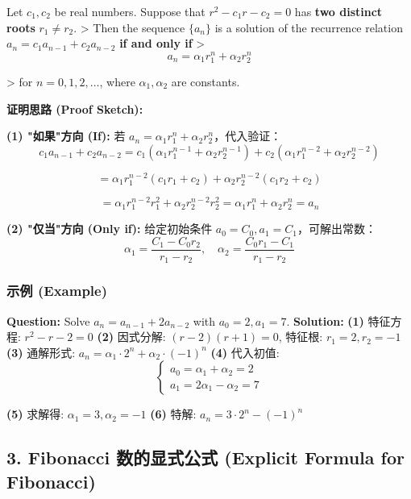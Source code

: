 \documentclass[10pt,a4paper,openany]{ctexbook}
\theoremstyle{definition}
\theoremstyle{remark}
\renewenvironment{quote}
  {\list{}{\leftmargin=1em\rightmargin=0pt\topsep=0.5pt\partopsep=0pt}\item[]}
  {\endlist}
\begin{document}
\begin{quote}
Let $c_1, c_2$ be real numbers. Suppose that $r^2 - c_1 r - c_2 = 0$ has \textbf{two distinct roots} $r_1 \neq r_2$.
>
Then the sequence $\{a_n\}$ is a solution of the recurrence relation $a_n = c_1 a_{n-1} + c_2 a_{n-2}$ \textbf{if and only if}
>
\[
a_n = \alpha_1 r_1^n + \alpha_2 r_2^n
\]

>
for $n = 0, 1, 2, \dots$, where $\alpha_1, \alpha_2$ are constants.

\textbf{证明思路 (Proof Sketch):}

\textbf{(1) "如果"方向 (If):}
若 $a_n = \alpha_1 r_1^n + \alpha_2 r_2^n$，代入验证：
\[
c_1 a_{n-1} + c_2 a_{n-2} = c_1(\alpha_1 r_1^{n-1} + \alpha_2 r_2^{n-1}) + c_2(\alpha_1 r_1^{n-2} + \alpha_2 r_2^{n-2})
\]

\[
= \alpha_1 r_1^{n-2}(c_1 r_1 + c_2) + \alpha_2 r_2^{n-2}(c_1 r_2 + c_2)
\]

\[
= \alpha_1 r_1^{n-2} r_1^2 + \alpha_2 r_2^{n-2} r_2^2 = \alpha_1 r_1^n + \alpha_2 r_2^n = a_n
\]


\textbf{(2) "仅当"方向 (Only if):}
给定初始条件 $a_0 = C_0, a_1 = C_1$，可解出常数：
\[
\alpha_1 = \frac{C_1 - C_0 r_2}{r_1 - r_2}, \quad \alpha_2 = \frac{C_0 r_1 - C_1}{r_1 - r_2}
\]


\end{quote}
\vspace{-2pt}

\subsubsection{示例 (Example)}

\textbf{Question:} Solve $a_n = a_{n-1} + 2a_{n-2}$ with $a_0 = 2, a_1 = 7$.
\textbf{Solution:}
\textbf{(1)} 特征方程: $r^2 - r - 2 = 0$
\textbf{(2)} 因式分解: $(r-2)(r+1) = 0$, 特征根: $r_1 = 2, r_2 = -1$
\textbf{(3)} 通解形式: $a_n = \alpha_1 \cdot 2^n + \alpha_2 \cdot (-1)^n$
\textbf{(4)} 代入初值:
\[
\begin{cases}
a_0 = \alpha_1 + \alpha_2 = 2 \\
a_1 = 2\alpha_1 - \alpha_2 = 7
\end{cases}
\]

\textbf{(5)} 求解得: $\alpha_1 = 3, \alpha_2 = -1$
\textbf{(6)} 特解: $a_n = 3 \cdot 2^n - (-1)^n$
\vspace{-2pt}

\subsection{3. Fibonacci 数的显式公式 (Explicit Formula for Fibonacci)}
\end{document}

